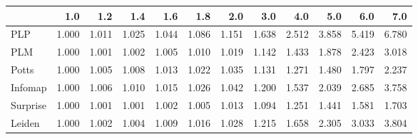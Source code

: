 \begin{tabular}{lrrrrrrrrrrr}
\toprule
{} &   1.0 &   1.2 &   1.4 &   1.6 &   1.8 &   2.0 &   3.0 &   4.0 &   5.0 &   6.0 &   7.0 \\
\midrule
PLP      & 1.000 & 1.011 & 1.025 & 1.044 & 1.086 & 1.151 & 1.638 & 2.512 & 3.858 & 5.419 & 6.780 \\
PLM      & 1.000 & 1.001 & 1.002 & 1.005 & 1.010 & 1.019 & 1.142 & 1.433 & 1.878 & 2.423 & 3.018 \\
Potts    & 1.000 & 1.005 & 1.008 & 1.013 & 1.022 & 1.035 & 1.131 & 1.271 & 1.480 & 1.797 & 2.237 \\
Infomap  & 1.000 & 1.006 & 1.010 & 1.015 & 1.026 & 1.042 & 1.200 & 1.537 & 2.039 & 2.685 & 3.758 \\
Surprise & 1.000 & 1.001 & 1.001 & 1.002 & 1.005 & 1.013 & 1.094 & 1.251 & 1.441 & 1.581 & 1.703 \\
Leiden   & 1.000 & 1.002 & 1.004 & 1.009 & 1.016 & 1.028 & 1.215 & 1.658 & 2.305 & 3.033 & 3.804 \\
\bottomrule
\end{tabular}
